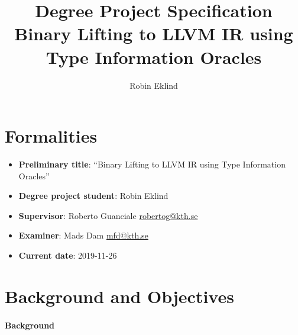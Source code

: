 \documentclass[12pt, a4paper]{article}
\title{Degree Project Specification \\ \Large Binary Lifting to LLVM IR using Type Information Oracles}
\author{Robin Eklind \\ }
\begin{document}



\maketitle

\clearpage


\tableofcontents

\clearpage




\section{Formalities}

\begin{itemize}
	\item \textbf{Preliminary title}: ``Binary Lifting to LLVM IR using Type Information Oracles''
	\item \textbf{Degree project student}: Robin Eklind 
	\item \textbf{Supervisor}: Roberto Guanciale \url{robertog@kth.se}
	\item \textbf{Examiner}: Mads Dam \url{mfd@kth.se}
	\item \textbf{Current date}: 2019-11-26
\end{itemize}


\section{Background and Objectives}


\paragraph{Background}
\end{document}
